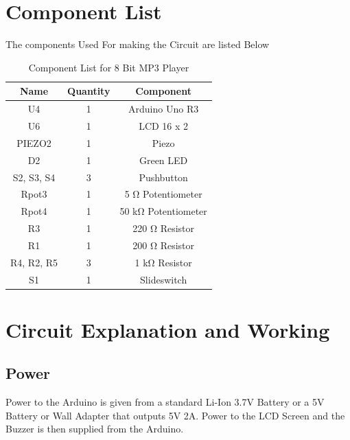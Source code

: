 \documentclass[11pt]{article}
\begin{document}
\section{Component List}
The components Used For making the Circuit are listed Below
\begin{table}[H]
	\centering
	\caption{Component List for 8 Bit MP3 Player}
	\vspace{5pt}
	\begin{tabular}{|c|c|c|}
		\hline
		\textbf{Name}       & \textbf{Quantity} & \textbf{Component}  \\ \hline
		{U4}         & 1                 & Arduino Uno R3      \\ \hline
		{U6}         & 1                 & LCD 16 x 2          \\ \hline
		{PIEZO2}     & 1                 & Piezo               \\ \hline
		{D2}         & 1                 & Green LED           \\ \hline
		{S2, S3, S4} & 3                 & Pushbutton          \\ \hline
		{Rpot3}      & 1                 & 5 Ω Potentiometer   \\ \hline
		{Rpot4}      & 1                 & 50 kΩ Potentiometer \\ \hline
		{R3}         & 1                 & 220 Ω Resistor      \\ \hline
		{R1}         & 1                 & 200 Ω Resistor      \\ \hline
		{R4, R2, R5} & 3                 & 1 kΩ Resistor       \\ \hline
		{S1}         & 1                 & Slideswitch         \\ \hline
		
	\end{tabular}
\end{table}

\section{Circuit Explanation and Working}

\subsection{Power}	
Power to the Arduino is given from a standard Li-Ion 3.7V Battery or a 5V Battery or Wall Adapter that outputs 5V 2A.
Power to the LCD Screen and the Buzzer is then supplied from the Arduino.
\end{document}

